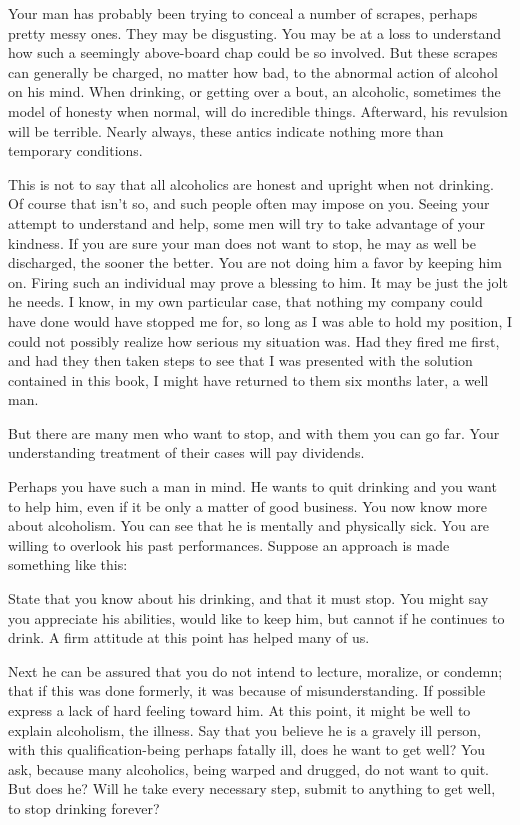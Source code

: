 \begin{biblechapter}
Your man has probably been trying to conceal a number of scrapes, perhaps pretty messy ones.  They may be disgusting.  You may be at a loss to understand how such a seemingly above-board chap could be so involved.  But these scrapes can generally be charged, no matter how bad, to the abnormal action of alcohol on his mind.  When drinking, or getting over a bout, an alcoholic, sometimes the model of honesty when normal, will do incredible things.  Afterward, his revulsion will be terrible.  Nearly always, these antics indicate nothing more than temporary conditions.

This is not to say that all alcoholics are honest and upright when not drinking.  Of course that isn't so, and such people often may impose on you.  Seeing your attempt to understand and help, some men will try to take advantage of your kindness.  If you are sure your man does not want to stop, he may as well be discharged, the sooner the better.  You are not doing him a favor by keeping him on.  Firing such an individual may prove a blessing to him.  It may be just the jolt he needs.  I know, in my own particular case, that nothing my company could have done would have stopped me for, so long as I was able to hold my position, I could not possibly realize how serious my situation was.  Had they fired me first, and had they then taken steps to see that I was presented with the solution contained in this book, I might have returned to them six months later, a well man.

But there are many men who want to stop, and with them you can go far.  Your understanding treatment of their cases will pay dividends.

Perhaps you have such a man in mind.  He wants to quit drinking and you want to help him, even if it be only a matter of good business.  You now know more about alcoholism.  You can see that he is mentally and physically sick.  You are willing to overlook his past performances.  Suppose an approach is made something like this:

State that you know about his drinking, and that it must stop.  You might say you appreciate his abilities, would like to keep him, but cannot if he continues to drink.  A firm attitude at this point has helped many of us.

Next he can be assured that you do not intend to lecture, moralize, or condemn; that if this was done formerly, it was because of misunderstanding.  If possible express a lack of hard feeling toward him.  At this point, it might be well to explain alcoholism, the illness.  Say that you believe he is a gravely ill person, with this qualification-being perhaps fatally ill, does he want to get well?  You ask, because many alcoholics, being warped and drugged, do not want to quit.  But does he?  Will he take every necessary step, submit to anything to get well, to stop drinking forever?


\end{biblechapter}
